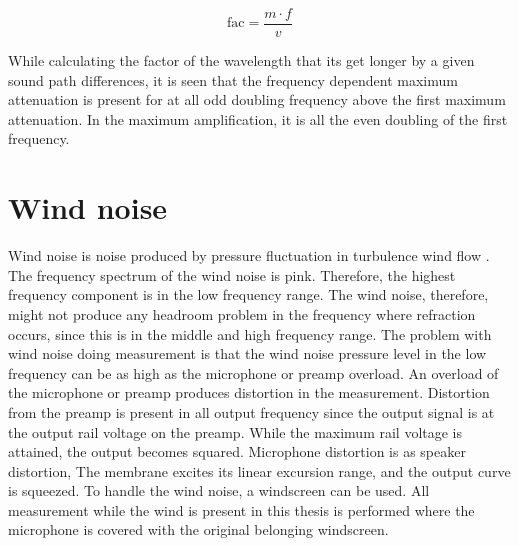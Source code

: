 \begin{equation}\label{pre:fac_wav}
\text{fac} = \frac{m \cdot f}{v}
\end{equation}  

\startexplain
{}
\stopexplain


While calculating the factor of the wavelength that its get longer by a given sound path differences, it is seen that the frequency dependent maximum attenuation is present for at all odd doubling frequency above the first maximum attenuation. In the maximum amplification, it is all the even doubling of the first frequency.


\section{Wind noise}\label{pre:wind_noise}
Wind noise is noise produced by pressure fluctuation in turbulence wind flow \citep{doi:10.1121/1.4780400}. The frequency spectrum of the wind noise is pink. Therefore, the highest frequency component is in the low frequency range. The wind noise, therefore, might not produce any headroom problem in the frequency where refraction occurs, since this is in the middle and high frequency range. The problem with wind noise doing measurement is that the wind noise pressure level in the low frequency can be as high as the microphone or preamp overload. An overload of the microphone or preamp produces distortion in the measurement. Distortion from the preamp is present in all output frequency since the output signal is at the output rail voltage on the preamp. While the maximum rail voltage is attained, the output becomes squared. Microphone distortion is as speaker distortion, The membrane excites its linear excursion range, and the output curve is squeezed. To handle the wind noise, a windscreen can be used. All measurement while the wind is present in this thesis is performed where the microphone is covered with the original belonging windscreen.  



 